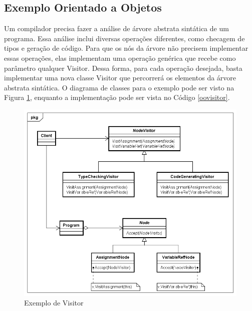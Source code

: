 \subsection*{Exemplo Orientado a Objetos}

Um compilador precisa fazer a análise de árvore abstrata sintática de 
um programa. Essa análise inclui diversas operações diferentes, como 
checagem de tipos e geração de código. Para que os nós da árvore 
não precisem implementar essas operações, elas implementam uma operação 
genérica que recebe como parâmetro qualquer Visitor. Dessa forma, para 
cada operação desejada, basta implementar uma nova classe Visitor 
que percorrerá os elementos da árvore abstrata sintática. O diagrama 
de classes para o exemplo pode ser visto na Figura \ref{visitor_exemplo1}, 
enquanto a implementação pode ser vista no Código \ref{oovisitor}.

\begin{figure}[htb]
	\caption{\label{visitor_exemplo1}Exemplo de Visitor}
	\begin{center}
	    \includegraphics[scale=0.5]{5_padroes-contexto-funcional/5.3_comportamentais/5.3.11_visitor/visitor_exemplo.png}
	\end{center}
\end{figure}

